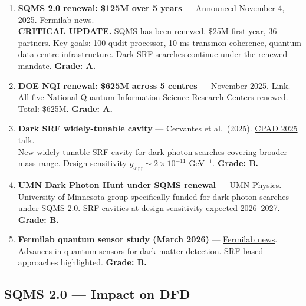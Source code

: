 \documentclass[11pt,a4paper]{article}
\begin{document}
\begin{enumerate}
\item \textbf{SQMS 2.0 renewal: \$125M over 5 years} --- Announced November 4, 2025. \href{https://news.fnal.gov/2025/11/fermilabs-sqms-center-funded-with-125-million-to-shape-the-future-of-quantum-information-science/}{Fermilab news}.\\
\textbf{CRITICAL UPDATE.} SQMS has been renewed. \$25M first year, 36 partners. Key goals: 100-qudit processor, 10 ms transmon coherence, quantum data centre infrastructure. Dark SRF searches continue under the renewed mandate. \textbf{Grade: A.}

\item \textbf{DOE NQI renewal: \$625M across 5 centres} --- November 2025. \href{https://www.rigzone.com/news/usa_energy_dept_announces_625mm_to_renew_5_nqisr_centers-11-nov-2025-182294-article/}{Link}.\\
All five National Quantum Information Science Research Centers renewed. Total: \$625M. \textbf{Grade: A.}

\item \textbf{Dark SRF widely-tunable cavity} --- Cervantes et al.\ (2025). \href{https://indico.global/event/14966/contributions/134111/attachments/63287/122128/RaphaelCervantesCPAD2025.pdf}{CPAD 2025 talk}.\\
New widely-tunable SRF cavity for dark photon searches covering broader mass range. Design sensitivity $g_{a\gamma\gamma} \sim 2 \times 10^{-11}$ GeV$^{-1}$. \textbf{Grade: B.}

\item \textbf{UMN Dark Photon Hunt under SQMS renewal} --- \href{https://cse.umn.edu/physics/news/does-quantum-center-sqms-renewal-fuels-umns-hunt-dark-photons}{UMN Physics}.\\
University of Minnesota group specifically funded for dark photon searches under SQMS 2.0. SRF cavities at design sensitivity expected 2026--2027. \textbf{Grade: B.}

\item \textbf{Fermilab quantum sensor study (March 2026)} --- \href{https://news.fnal.gov/2026/03/fermilab-led-study-advances-development-of-sophisticated-quantum-sensors-to-track-high-energy-particles-and-detect-dark-matter/}{Fermilab news}.\\
Advances in quantum sensors for dark matter detection. SRF-based approaches highlighted. \textbf{Grade: B.}
\end{enumerate}

\subsection{SQMS 2.0 --- Impact on DFD}
\end{document}
